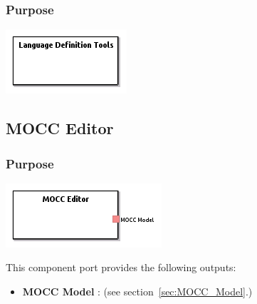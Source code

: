 \documentclass{gemoc} %
\begin{document}

\subsubsection{Purpose}


\begin{center}
\includegraphics*[trim=0.0cm 0.0cm 0cm 0.0cm, clip=true]{../images/generated/Generated_Language_Definition_Tools.png}
\end{center}




\subsection{MOCC Editor}
\label{sec:MOCC_Editor}


\subsubsection{Purpose}


\begin{center}
\includegraphics*[trim=0.0cm 0.0cm 0cm 0.0cm, clip=true]{../images/generated/Generated_MOCC_Editor.png}
\end{center}


This component port provides the following outputs:
\begin{itemize}
  \item \textbf{MOCC Model} :
(see section~\ref{sec:MOCC_Model}.)
\end{itemize}
\end{document}
